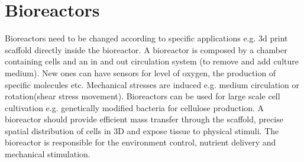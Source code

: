 \section{Bioreactors}
Bioreactors need to be changed according to specific applications e.g. 3d print scaffold directly inside the bioreactor. 
A bioreactor is composed by a chamber containing cells and an in and out circulation system (to remove and add culture medium).
New ones can have sensors for level of oxygen, the production of specific molecules etc.
Mechanical stresses are induced e.g. medium circulation or rotation(shear stress movement).
Bioreactors can be used for large scale cell cultivation e.g. genetically modified bacteria for cellulose production.  A bioreactor should provide efficient mass transfer through the scaffold, precise spatial distribution of cells in 3D and expose tissue to physical stimuli. 
The bioreactor is responsible for the environment control, nutrient delivery and mechanical stimulation.





